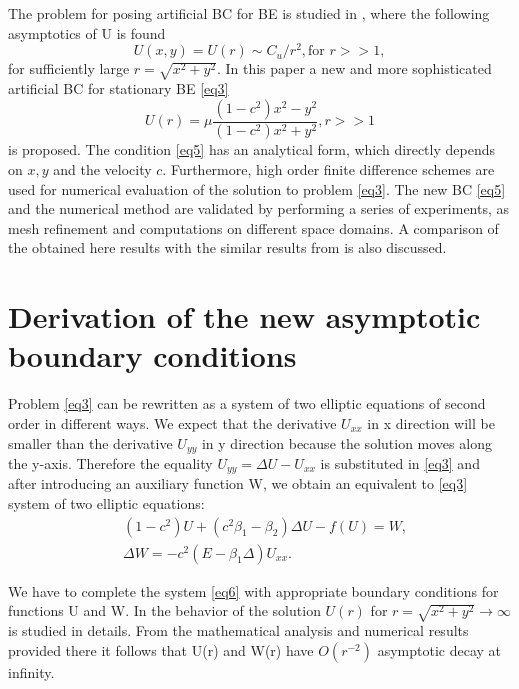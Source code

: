 \documentclass[12pt]{article}
\theoremstyle{theorem}
\theoremstyle{defi}
\begin{document}
The problem for posing artificial BC for BE is studied in \cite{ref6}, where the following asymptotics of U is found
\begin{equation}
U(x,y) = U(r) \sim  C_u/r^2, \text{for } r >> 1, \label{eq4}
\end{equation}
for sufficiently large $r=\sqrt{x^2 + y^2}$.
In this paper a new and more sophisticated artificial BC for stationary BE \eqref{eq3}
\begin{equation}
U(r) =  \mu \frac{(1-c^2)x^2 - y^2}{(1-c^2)x^2 + y^2}, r >> 1  \label{eq5}
\end{equation}
is proposed. The condition \eqref{eq5}  has an analytical form, which directly depends on $x,y$ and the velocity $c$. Furthermore, high order finite difference schemes are used for numerical evaluation of the solution to problem \eqref{eq3}. The new BC \eqref{eq5} and the numerical method are validated by performing a series of experiments, as mesh refinement and computations on different space domains. A comparison of the obtained here results with the similar results from  \cite{ref10} is also discussed.

\section{Derivation of the new asymptotic boundary conditions }

Problem \eqref{eq3} can be rewritten as a system of two elliptic equations of second order in different ways. We expect that the derivative  $U_{xx}$ in x direction will be smaller than the derivative $U_{yy}$  in y direction because the solution moves along the y-axis. Therefore the equality $U_{yy} = \Delta U - U_{xx}$  is substituted in \eqref{eq3} and after introducing an auxiliary function W, we obtain an equivalent to \eqref{eq3} system of two elliptic equations:
\begin{equation}\label{eq6}
\begin{split}
&(1-c^2) U + ( c^2\beta_1 -  \beta_2) \Delta U  - f (U) = W, \\
&\Delta W =  -c^2  (E- \beta_1 \Delta) U_{xx}.
\end{split}
\end{equation}

We have to complete the system \eqref{eq6} with appropriate boundary conditions for functions U and W. In \cite{ref6} the behavior of the solution $U(r)$ for  $ r=\sqrt{x^2 + y^2}\rightarrow \infty$ is studied in details. From the mathematical analysis and numerical results provided there it follows that U(r) and W(r) have  $O(r^{-2})$ asymptotic decay at infinity.
\end{document}
